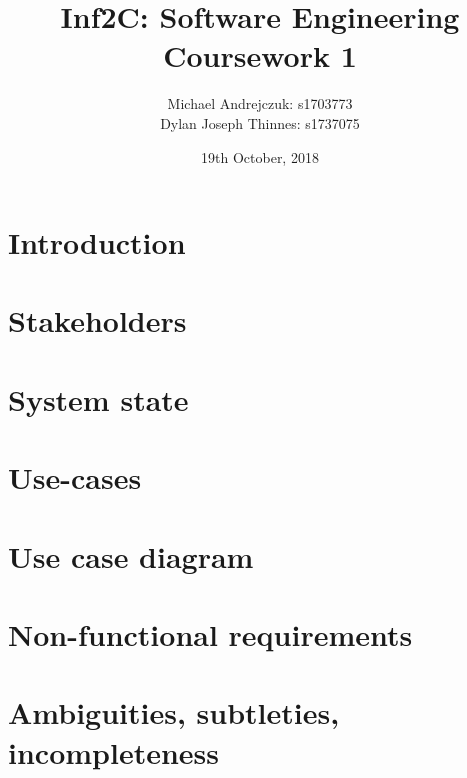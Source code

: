 \documentclass{report}
\begin{document}
\title{Inf2C: Software Engineering \\Coursework 1}
\author{Michael Andrejczuk: s1703773 \\
  Dylan Joseph Thinnes: s1737075}
\date{19th October, 2018}
\maketitle

\section{Introduction}
 
\section{Stakeholders}

\section{System state}

\section{Use-cases}

\section{Use case diagram}

\section{Non-functional requirements}

\section{Ambiguities, subtleties, incompleteness}
\end{document}
